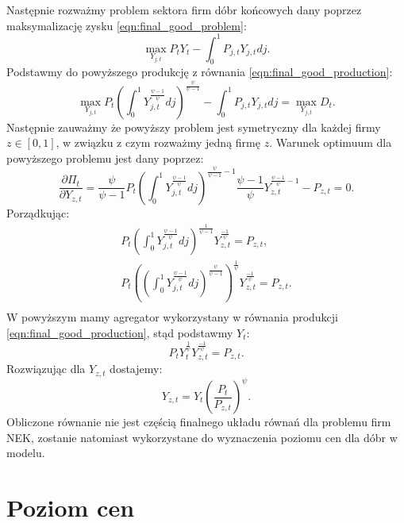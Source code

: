 Następnie rozważmy problem sektora firm dóbr końcowych dany poprzez maksymalizację zysku \eqref{eqn:final_good_problem}:
\begin{equation}
    \max_{Y_{j,t}} P_t Y_t - \int_0^1P_{j,t}Y_{j,t} dj.
\end{equation}
Podstawmy do powyższego produkcję z równania \eqref{eqn:final_good_production}:
\begin{equation}
    \max_{Y_{j,t}} P_t \left(\int_0^1 Y_{j,t}^{\frac{\psi-1}{\psi}}dj\right)^{\frac{\psi}{\psi-1}} - \int_0^1P_{j,t}Y_{j,t} dj = \max_{Y_{j,t}} D_t.
\end{equation}
Następnie zauważmy że powyższy problem jest symetryczny dla każdej firmy $z \in [0,1]$, w związku z czym rozważmy jedną firmę $z$. Warunek optimuum dla powyższego problemu jest dany poprzez:
\begin{equation}
    \frac{\partial \Pi_t}{\partial Y_{z,t}} = \frac{\psi}{\psi-1} P_t \left(\int_0^1 Y_{j,t}^{\frac{\psi-1}{\psi}}dj\right)^{\frac{\psi}{\psi-1} - 1} \frac{\psi-1}{\psi} Y_{z,t}^{\frac{\psi-1}{\psi} - 1}- P_{z,t} = 0.
\end{equation}
Porządkując:
\begin{gather}
    P_t \left(\int_0^1 Y_{j,t}^{\frac{\psi-1}{\psi}}dj\right)^{\frac{1}{\psi-1}} Y_{z,t}^{\frac{-1}{\psi}} = P_{z,t}, \\
    P_t \left(\left(\int_0^1 Y_{j,t}^{\frac{\psi-1}{\psi}}dj\right)^{\frac{\psi}{\psi-1}}\right)^{\frac{1}{\psi}} Y_{z,t}^{\frac{-1}{\psi}} = P_{z,t}. \\
\end{gather}
W powyższym mamy agregator wykorzystany w równania produkcji \eqref{eqn:final_good_production}, stąd podstawmy $Y_t$:
\begin{equation}
    P_t Y_t^{\frac{1}{\psi}} Y_{z,t}^{\frac{-1}{\psi}} = P_{z,t}.
\end{equation}
Rozwiązując dla $Y_{z,t}$ dostajemy:
\begin{equation}
    \label{eqn:solution-final-good}
    Y_{z,t} = Y_t \left(\frac{P_t}{P_{z,t}}\right)^\psi.
\end{equation}
Obliczone równanie nie jest częścią finalnego układu równań dla problemu firm NEK, zostanie natomiast wykorzystane do wyznaczenia poziomu cen dla dóbr w modelu.


\section{Poziom cen}
\label{sec:price_level}

